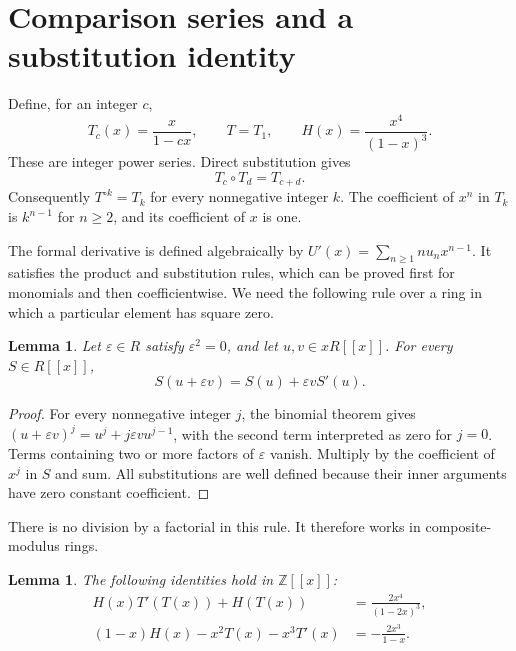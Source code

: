 \documentclass[11pt,a4paper]{article}
\newtheorem{lemma}[theorem]{Lemma}
\theoremstyle{remark}\newtheorem{remark}[theorem]{Remark}
\newcommand{\Z}{\mathbb Z}
\begin{document}
\section{Comparison series and a substitution identity}

Define, for an integer $c$,
\begin{equation}\label{eq:tH}
T_c(x)=\frac{x}{1-cx},\qquad T=T_1,\qquad
H(x)=\frac{x^4}{(1-x)^3}.
\end{equation}
These are integer power series. Direct substitution gives
\begin{equation}\label{eq:t-group}
T_c\circ T_d=T_{c+d}.
\end{equation}
Consequently $T^{\circ k}=T_k$ for every nonnegative integer $k$.
The coefficient of $x^n$ in $T_k$ is $k^{n-1}$ for $n\ge2$,
and its coefficient of $x$ is one.

The formal derivative is defined algebraically by
$U'(x)=\sum_{n\ge1}nu_nx^{n-1}$. It satisfies the product and
substitution rules, which can be proved first for monomials and then
coefficientwise. We need the following rule over a ring in which a
particular element has square zero.

\begin{lemma}\label{lem:taylor}
Let $\varepsilon\in R$ satisfy $\varepsilon^2=0$, and let
$u,v\in xR[[x]]$. For every $S\in R[[x]]$,
\[
S(u+\varepsilon v)=S(u)+\varepsilon vS'(u).
\]
\end{lemma}

\begin{proof}
For every nonnegative integer $j$, the binomial theorem gives
$(u+\varepsilon v)^j=u^j+j\varepsilon vu^{j-1}$, with the second
term interpreted as zero for $j=0$. Terms containing two or more
factors of $\varepsilon$ vanish. Multiply by the coefficient of
$x^j$ in $S$ and sum. All substitutions are well defined because
their inner arguments have zero constant coefficient.
\end{proof}

There is no division by a factorial in this rule. It therefore works
in composite-modulus rings.

\begin{lemma}\label{lem:identities}
The following identities hold in $\Z[[x]]$:
\begin{align}
H(x)T'(T(x))+H(T(x))&=\frac{2x^4}{(1-2x)^3},
\label{eq:identity1}\\
(1-x)H(x)-x^2T(x)-x^3T'(x)&=-\frac{2x^3}{1-x}.
\label{eq:identity2}
\end{align}
\end{lemma}
\end{document}
